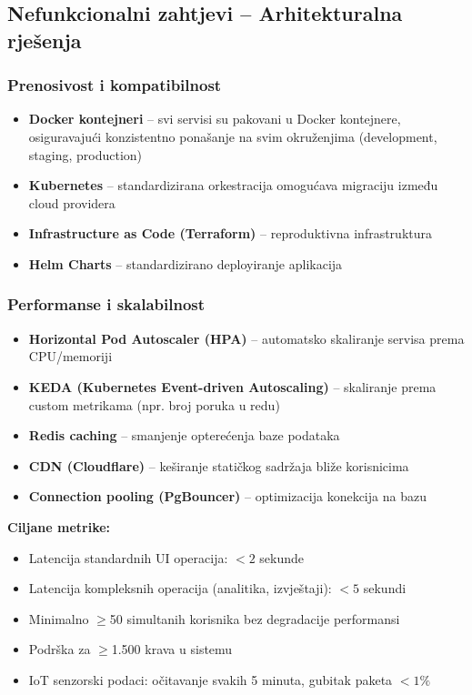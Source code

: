 \documentclass{article}
\begin{document}
\subsection{Nefunkcionalni zahtjevi -- Arhitekturalna rješenja}

\subsubsection{Prenosivost i kompatibilnost}

\begin{itemize}
    \item \textbf{Docker kontejneri} -- svi servisi su pakovani u Docker kontejnere, osiguravajući konzistentno ponašanje na svim okruženjima (development, staging, production)
    \item \textbf{Kubernetes} -- standardizirana orkestracija omogućava migraciju između cloud providera
    \item \textbf{Infrastructure as Code (Terraform)} -- reproduktivna infrastruktura
    \item \textbf{Helm Charts} -- standardizirano deployiranje aplikacija
\end{itemize}

\subsubsection{Performanse i skalabilnost}

\begin{itemize}
    \item \textbf{Horizontal Pod Autoscaler (HPA)} -- automatsko skaliranje servisa prema CPU/memoriji
    \item \textbf{KEDA (Kubernetes Event-driven Autoscaling)} -- skaliranje prema custom metrikama (npr. broj poruka u redu)
    \item \textbf{Redis caching} -- smanjenje opterećenja baze podataka
    \item \textbf{CDN (Cloudflare)} -- keširanje statičkog sadržaja bliže korisnicima
    \item \textbf{Connection pooling (PgBouncer)} -- optimizacija konekcija na bazu
\end{itemize}

\textbf{Ciljane metrike:}
\begin{itemize}
    \item Latencija standardnih UI operacija: $<2$ sekunde
    \item Latencija kompleksnih operacija (analitika, izvještaji): $<5$ sekundi
    \item Minimalno $\geq$50 simultanih korisnika bez degradacije performansi
    \item Podrška za $\geq$1.500 krava u sistemu
    \item IoT senzorski podaci: očitavanje svakih 5 minuta, gubitak paketa $<1\%$
\end{itemize}
\end{document}
